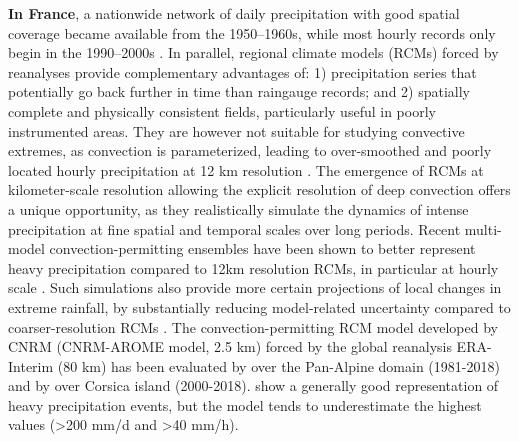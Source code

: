 \documentclass[french,a4paper,DIV=11,numbers=noendperiod]{scrartcl}
\begin{document}
\textbf{In France}, a nationwide network of daily precipitation with good spatial coverage became available from the 1950–1960s, while most hourly records only begin in the 1990–2000s \parencite{meteofrance2024}. In parallel, regional climate models (RCMs) forced by reanalyses provide complementary advantages of: 1) precipitation series that potentially go back further in time than raingauge records; and 2) spatially complete and
physically consistent fields, particularly useful in poorly instrumented
areas. They are however not suitable for studying convective extremes, as convection is parameterized, leading to over-smoothed and
poorly located hourly precipitation at 12 km resolution \parencite{KilometerScaleClimateModelsProspectsandChallenges}. 
The emergence of RCMs at kilometer-scale resolution allowing the explicit resolution of deep convection  offers a unique opportunity, as they realistically simulate the dynamics of intense precipitation at fine spatial and temporal scales over long periods. Recent multi-model convection-permitting ensembles have been shown to better represent heavy precipitation  compared to 12km resolution RCMs, in particular at hourly scale  \parencite{ban-etal-2021,pichelli-etal-2021}. Such simulations also provide more certain projections of local changes in extreme rainfall, by substantially reducing model-related uncertainty compared to coarser-resolution RCMs \parencite{Fosser2024}. The convection-permitting RCM model developed by CNRM (CNRM-AROME model, 2.5 km) forced by the global reanalysis ERA-Interim (80 km) has been evaluated by \cite{Caillaud2021} over the Pan-Alpine domain (1981-2018) and by \cite{Cortes-Hernandez2024} over Corsica island (2000-2018). \cite{Caillaud2021} show a generally good representation of heavy precipitation events, but the model tends to underestimate the highest values (>200 mm/d and >40 mm/h).
\end{document}
